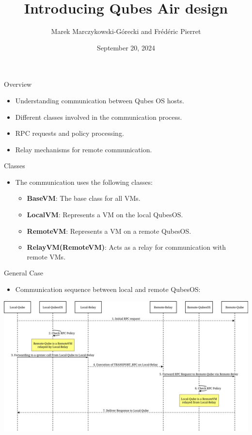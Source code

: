 \documentclass{beamer}
\title{Introducing Qubes Air design}
\author{Marek Marczykowski-Górecki and Frédéric Pierret}
\date{September 20, 2024}
\begin{document}
\frame{\titlepage}


\begin{frame}{Overview}
    \begin{itemize}
        \item Understanding communication between Qubes OS hosts.
        \item Different classes involved in the communication process.
        \item RPC requests and policy processing.
        \item Relay mechanisms for remote communication.
    \end{itemize}
\end{frame}

\begin{frame}{Classes}
    \begin{itemize}
        \item The communication uses the following classes:
        \begin{itemize}
            \item \textbf{BaseVM}: The base class for all VMs.
            \item \textbf{LocalVM}: Represents a VM on the local QubesOS.
            \item \textbf{RemoteVM}: Represents a VM on a remote QubesOS.
            \item \textbf{RelayVM(RemoteVM)}: Acts as a relay for communication with remote VMs.
        \end{itemize}
    \end{itemize}
\end{frame}

\begin{frame}{General Case}
    \begin{itemize}
        \item Communication sequence between local and remote QubesOS:
    \end{itemize}
    \begin{center}
        \includegraphics[width=\linewidth]{general.png}
    \end{center}
\end{frame}
\end{document}
